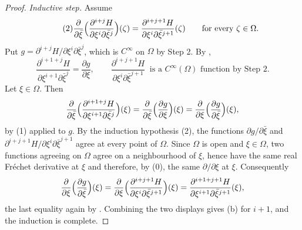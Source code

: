 \begin{proof}
\emph{Inductive step.}  Assume
\begin{equation}\tag{2}
  \frac{\partial}{\partial\bar\xi}
  \Bigl(\frac{\partial^{i+j}H}{\partial\xi^i\partial\bar\xi^j}\Bigr)(\zeta)
  =\frac{\partial^{i+j+1}H}{\partial\xi^i\partial\bar\xi^{j+1}}(\zeta)
  \qquad\text{for every }\zeta\in\Omega .
\end{equation}
Put $g=\partial^{i+j}H/\partial\xi^i\partial\bar\xi^j$, which is $C^\infty$ on
$\Omega$ by Step 2.  By ,
\[
  \frac{\partial^{i+1+j}H}{\partial\xi^{i+1}\partial\bar\xi^{j}}
  =\frac{\partial g}{\partial\xi},
  \qquad
  \frac{\partial^{i+j+1}H}{\partial\xi^{i}\partial\bar\xi^{j+1}}
  \ \text{ is a $C^\infty(\Omega)$ function by Step 2.}
\]
Let $\xi\in\Omega$.  Then
\[
  \frac{\partial}{\partial\bar\xi}
  \Bigl(\frac{\partial^{i+1+j}H}{\partial\xi^{i+1}\partial\bar\xi^{j}}\Bigr)(\xi)
  =\frac{\partial}{\partial\bar\xi}\Bigl(\frac{\partial g}{\partial\xi}\Bigr)(\xi)
  =\frac{\partial}{\partial\xi}\Bigl(\frac{\partial g}{\partial\bar\xi}\Bigr)(\xi),
\]
by (1) applied to $g$.  By the induction hypothesis (2), the functions
$\partial g/\partial\bar\xi$ and
$\partial^{i+j+1}H/\partial\xi^{i}\partial\bar\xi^{j+1}$ agree at every point
of $\Omega$.  Since $\Omega$ is open and $\xi\in\Omega$, two functions agreeing
on $\Omega$ agree on a neighbourhood of $\xi$, hence have the same real
Fr\'echet derivative at $\xi$ and therefore, by (0), the same
$\partial/\partial\xi$ at $\xi$.  Consequently
\[
  \frac{\partial}{\partial\xi}\Bigl(\frac{\partial g}{\partial\bar\xi}\Bigr)(\xi)
  =\frac{\partial}{\partial\xi}
   \Bigl(\frac{\partial^{i+j+1}H}{\partial\xi^{i}\partial\bar\xi^{j+1}}\Bigr)(\xi)
  =\frac{\partial^{i+1+j+1}H}{\partial\xi^{i+1}\partial\bar\xi^{j+1}}(\xi),
\]
the last equality again by .  Combining the two displays
gives (b) for $i+1$, and the induction is complete.
\end{proof}
